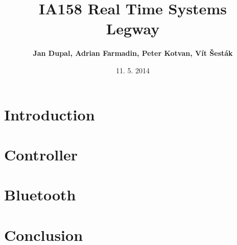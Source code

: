 \documentclass{article}
\title{
\textmd{IA158 Real Time Systems}\\
\textmd{\textbf{Legway}}
}
\author{\textbf{Jan Dupal, Adrian Farmadin, Peter Kotvan, Vít Šesták}}
\date{11. 5. 2014} %
\begin{document}
\maketitle

\section{Introduction}
\section{Controller}
\section{Bluetooth}
\section{Conclusion}
\end{document}

